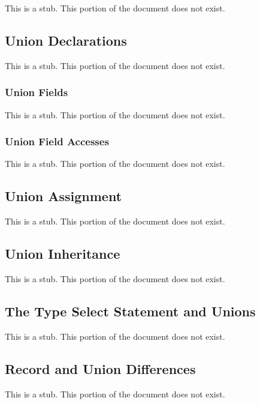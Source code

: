 \label{Unions}

This is a stub.  This portion of the document does not exist.

\subsection{Union Declarations}
\label{Union_Declarations}

This is a stub.  This portion of the document does not exist.

\subsubsection{Union Fields}
\label{Union_Fields}

This is a stub.  This portion of the document does not exist.

\subsubsection{Union Field Accesses}
\label{Union_Field_Accesses}

This is a stub.  This portion of the document does not exist.

\subsection{Union Assignment}
\label{Union_Assignment}

This is a stub.  This portion of the document does not exist.

\subsection{Union Inheritance}
\label{Union_Inheritance}

This is a stub.  This portion of the document does not exist.

\subsection{The Type Select Statement and Unions}
\label{The_Type_Select_Statement_and_Unions}

This is a stub.  This portion of the document does not exist.

\subsection{Record and Union Differences}
\label{Record_and_Union_Differences}

This is a stub.  This portion of the document does not exist.
